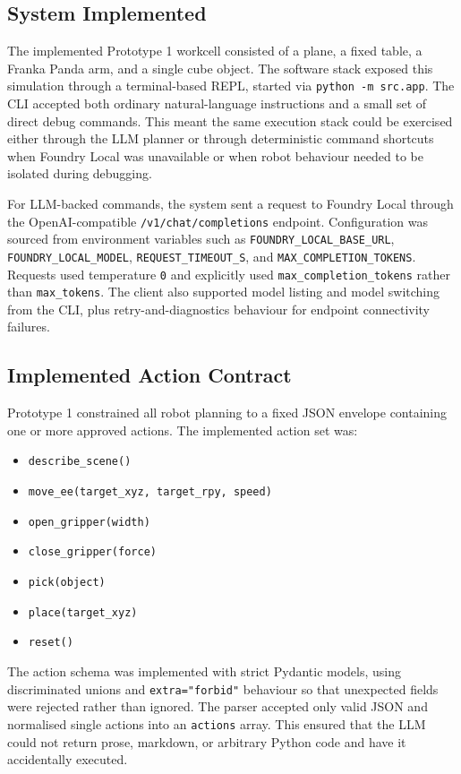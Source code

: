 \documentclass[12pt,a4paper]{article}
\begin{document}
\subsection{System Implemented}

The implemented Prototype 1 workcell consisted of a plane, a fixed table, a Franka Panda arm, and a single cube object. The software stack exposed this simulation through a terminal-based REPL, started via \texttt{python -m src.app}. The CLI accepted both ordinary natural-language instructions and a small set of direct debug commands. This meant the same execution stack could be exercised either through the LLM planner or through deterministic command shortcuts when Foundry Local was unavailable or when robot behaviour needed to be isolated during debugging.

For LLM-backed commands, the system sent a request to Foundry Local through the OpenAI-compatible \texttt{/v1/chat/completions} endpoint. Configuration was sourced from environment variables such as \texttt{FOUNDRY\_LOCAL\_BASE\_URL}, \texttt{FOUNDRY\_LOCAL\_MODEL}, \texttt{REQUEST\_TIMEOUT\_S}, and \texttt{MAX\_COMPLETION\_TOKENS}. Requests used temperature \texttt{0} and explicitly used \texttt{max\_completion\_tokens} rather than \texttt{max\_tokens}. The client also supported model listing and model switching from the CLI, plus retry-and-diagnostics behaviour for endpoint connectivity failures.

\subsection{Implemented Action Contract}

Prototype 1 constrained all robot planning to a fixed JSON envelope containing one or more approved actions. The implemented action set was:

\begin{itemize}
	\item \texttt{describe\_scene()}
	\item \texttt{move\_ee(target\_xyz, target\_rpy, speed)}
	\item \texttt{open\_gripper(width)}
	\item \texttt{close\_gripper(force)}
	\item \texttt{pick(object)}
	\item \texttt{place(target\_xyz)}
	\item \texttt{reset()}
\end{itemize}

The action schema was implemented with strict Pydantic models, using discriminated unions and \texttt{extra="forbid"} behaviour so that unexpected fields were rejected rather than ignored. The parser accepted only valid JSON and normalised single actions into an \texttt{actions} array. This ensured that the LLM could not return prose, markdown, or arbitrary Python code and have it accidentally executed.
\end{document}

